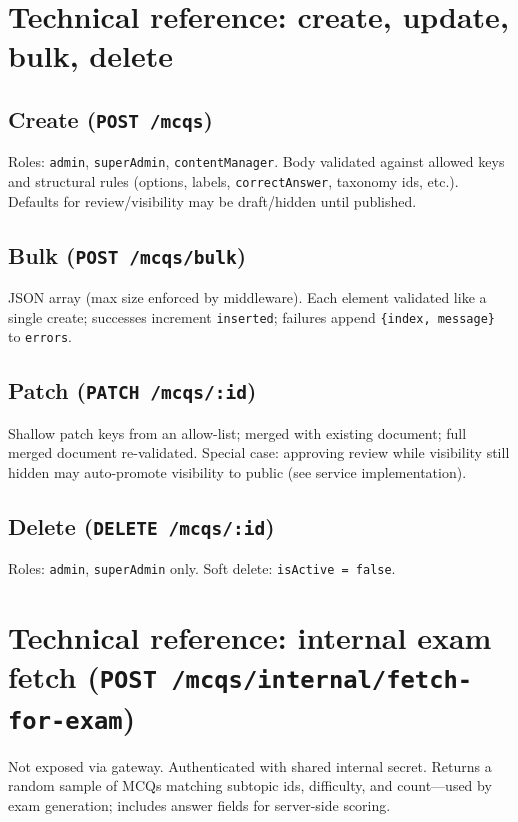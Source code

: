 \documentclass[11pt,a4paper]{article}
\begin{document}
\section{Technical reference: create, update, bulk, delete}

\subsection{Create (\texttt{POST /mcqs})}

Roles: \texttt{admin}, \texttt{superAdmin}, \texttt{contentManager}. Body validated against allowed keys and structural rules (options, labels, \texttt{correctAnswer}, taxonomy ids, etc.). Defaults for review/visibility may be draft/hidden until published.

\subsection{Bulk (\texttt{POST /mcqs/bulk})}

JSON array (max size enforced by middleware). Each element validated like a single create; successes increment \texttt{inserted}; failures append \texttt{\{index, message\}} to \texttt{errors}.

\subsection{Patch (\texttt{PATCH /mcqs/:id})}

Shallow patch keys from an allow-list; merged with existing document; full merged document re-validated. Special case: approving review while visibility still hidden may auto-promote visibility to public (see service implementation).

\subsection{Delete (\texttt{DELETE /mcqs/:id})}

Roles: \texttt{admin}, \texttt{superAdmin} only. Soft delete: \texttt{isActive = false}.

\section{Technical reference: internal exam fetch (\texttt{POST /mcqs/internal/fetch-for-exam})}

Not exposed via gateway. Authenticated with shared internal secret. Returns a random sample of MCQs matching subtopic ids, difficulty, and count---used by exam generation; includes answer fields for server-side scoring.
\end{document}
